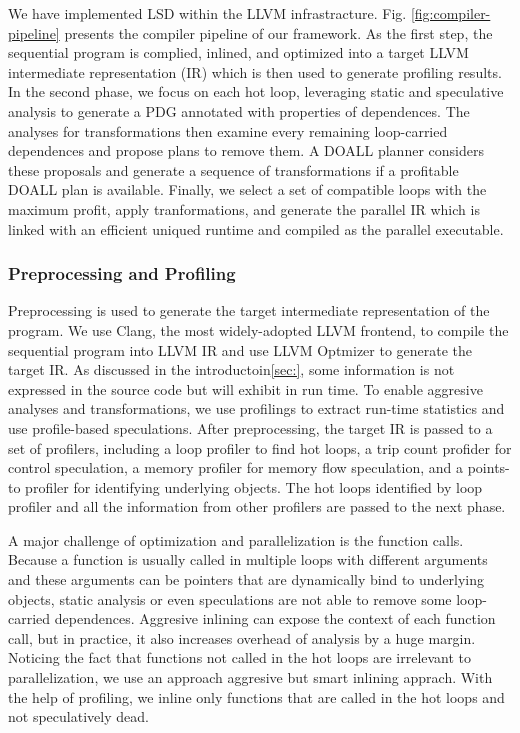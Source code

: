 We have implemented LSD within the LLVM infrastracture. Fig.
\ref{fig:compiler-pipeline} presents the compiler pipeline of our framework. As
the first step, the sequential program is complied, inlined, and optimized into
a target LLVM intermediate representation (IR) which is then used to generate
profiling results. In the second phase, we focus on each hot loop, leveraging
static and speculative analysis to generate a PDG annotated with properties of
dependences. The analyses for transformations then examine every remaining
loop-carried dependences and propose plans to remove them. A DOALL planner
considers these proposals and generate a sequence of transformations if a
profitable DOALL plan is available. Finally, we select a set of compatible loops
with the maximum profit, apply tranformations, and generate the parallel IR
which is linked with an efficient uniqued runtime and compiled as the
parallel executable.

\subsubsection{Preprocessing and Profiling}

Preprocessing is used to generate the target intermediate representation
of the program. We use Clang, the most widely-adopted LLVM frontend, to compile
the sequential program into LLVM IR and use LLVM Optmizer to generate the target
IR. As discussed in the introductoin\ref{sec:}, some information is not
expressed in the source code but will exhibit in run time. To enable aggresive
analyses and transformations, we use profilings to extract run-time statistics
and use profile-based speculations. After preprocessing, the target IR is passed
to a set of profilers, including a loop profiler to find hot loops, a trip count
profider for control speculation, a memory profiler for memory flow speculation,
and a points-to profiler for identifying underlying objects. The hot loops
identified by loop profiler and all the information from other profilers are
passed to the next phase.



A major challenge of optimization and parallelization is the function calls.
Because a function is usually called in multiple loops with different arguments
and these arguments can be pointers that are dynamically bind to underlying
objects, static analysis or even speculations are not able to remove some
loop-carried dependences. Aggresive inlining can expose the context of each
function call, but in practice, it also increases overhead of analysis by a huge
margin. Noticing the fact that functions not called in the hot loops are
irrelevant to parallelization, we use an approach aggresive but smart inlining
apprach. With the help of profiling, we inline only functions that are called in
the hot loops and not speculatively dead.

